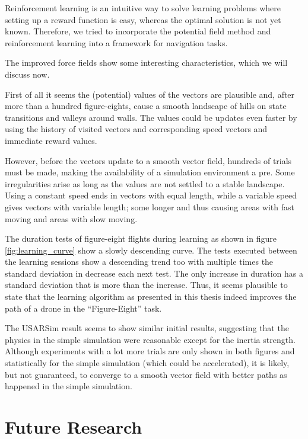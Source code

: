 \documentclass[11pt]{article}
\begin{document}
Reinforcement learning is an intuitive way to solve learning problems where setting up a reward function is easy, whereas the optimal solution is not yet known. Therefore, we tried to incorporate the potential field method and reinforcement learning into a framework for navigation tasks.

The improved force fields show some interesting characteristics, which we will discuss now.

First of all it seems the (potential) values of the vectors are plausible and, after more than a hundred figure-eights, cause a smooth landscape of hills on state transitions and valleys around walls. The values could be updates even faster by using the history of visited vectors and corresponding speed vectors and immediate reward values.

However, before the vectors update to a smooth vector field, hundreds of trials must be made, making the availability of a simulation environment a pre. Some irregularities arise as long as the values are not settled to a stable landscape. Using a constant speed ends in vectors with equal length, while a variable speed gives vectors with variable length; some longer and thus causing areas with fast moving and areas with slow moving.

The duration tests of figure-eight flights during learning as shown in figure \ref{fig:learning_curve} show a slowly descending curve. The tests executed between the learning sessions show a descending trend too with multiple times the standard deviation in decrease each next test. The only increase in duration has a standard deviation that is more than the increase. Thus, it seems plausible to state that the learning algorithm as presented in this thesis indeed improves the path of a drone in the ``Figure-Eight'' task.

The USARSim result seems to show similar initial results, suggesting that the physics in the simple simulation were reasonable except for the inertia strength. Although experiments with a lot more trials are only shown in both figures and statistically for the simple simulation (which could be accelerated), it is likely, but not guaranteed, to converge to a smooth vector field with better paths as happened in the simple simulation.



\section{Future Research}
\label{sec:future}
\end{document}
